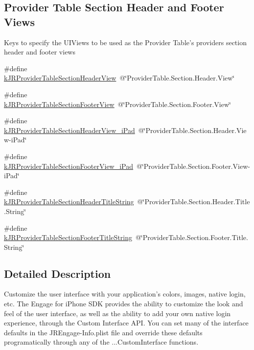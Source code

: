 \subsection*{Provider Table Section Header and Footer Views}
\label{_amgrp0087c3b750e6b14cf3b110df546a77d4}
 Keys to specify the UIViews to be used as the Provider Table's providers section header and footer views \begin{DoxyCompactItemize}
\item 
\#define \hyperlink{group__custom_interface_gaaff8ebdd2b9badb1d0a019a71d47db46}{kJRProviderTableSectionHeaderView}~@\char`\"{}ProviderTable.Section.Header.View\char`\"{}
\item 
\#define \hyperlink{group__custom_interface_ga984c096e9258dea402a1c27ae8bb6c8f}{kJRProviderTableSectionFooterView}~@\char`\"{}ProviderTable.Section.Footer.View\char`\"{}
\item 
\#define \hyperlink{group__custom_interface_ga7dcb3488390fabe1f3a358fb5af1e42c}{kJRProviderTableSectionHeaderView\_\-iPad}~@\char`\"{}ProviderTable.Section.Header.View-\/iPad\char`\"{}
\item 
\#define \hyperlink{group__custom_interface_gaa2196cc44d4e0dc4de9e98248c8a7e10}{kJRProviderTableSectionFooterView\_\-iPad}~@\char`\"{}ProviderTable.Section.Footer.View-\/iPad\char`\"{}
\item 
\#define \hyperlink{group__custom_interface_ga667a6c955993ec24292875f319a7d763}{kJRProviderTableSectionHeaderTitleString}~@\char`\"{}ProviderTable.Section.Header.Title.String\char`\"{}
\item 
\#define \hyperlink{group__custom_interface_ga72e63105251e7d4d6a363e279c2bf775}{kJRProviderTableSectionFooterTitleString}~@\char`\"{}ProviderTable.Section.Footer.Title.String\char`\"{}
\end{DoxyCompactItemize}


\subsection{Detailed Description}
Customize the user interface with your application's colors, images, native login, etc. The Engage for iPhone SDK provides the ability to customize the look and feel of the user interface, as well as the ability to add your own native login experience, through the Custom Interface API. You can set many of the interface defaults in the JREngage-\/Info.plist file and override these defaults programatically through any of the ...CustomInterface functions.

